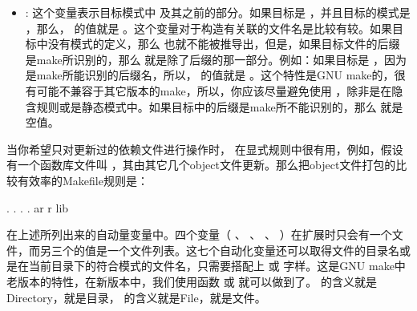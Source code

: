 \documentclass[a4paper,10pt]{sphinxmanual}
\begin{document}
\begin{itemize}
\item {} 
\sphinxcode{\sphinxupquote{\$*}} : 这个变量表示目标模式中 \sphinxcode{\sphinxupquote{\%}} 及其之前的部分。如果目标是  ，并且目标的模式是  ，那么， \sphinxcode{\sphinxupquote{\$*}} 的值就是  。这个变量对于构造有关联的文件名是比较有较。如果目标中没有模式的定义，那么 \sphinxcode{\sphinxupquote{\$*}} 也就不能被推导出，但是，如果目标文件的后缀是make所识别的，那么 \sphinxcode{\sphinxupquote{\$*}} 就是除了后缀的那一部分。例如：如果目标是  ，因为
 是make所能识别的后缀名，所以， \sphinxcode{\sphinxupquote{\$*}} 的值就是  。这个特性是GNU make的，很有可能不兼容于其它版本的make，所以，你应该尽量避免使用 \sphinxcode{\sphinxupquote{\$*}} ，除非是在隐含规则或是静态模式中。如果目标中的后缀是make所不能识别的，那么 \sphinxcode{\sphinxupquote{\$*}} 就是空值。

\end{itemize}

当你希望只对更新过的依赖文件进行操作时，  在显式规则中很有用，例如，假设有一个函数库文件叫  ，其由其它几个object文件更新。那么把object文件打包的比较有效率的Makefile规则是：

\begin{sphinxVerbatim}[commandchars=\\\{\}]
 . . . .
    ar r lib 
\end{sphinxVerbatim}

在上述所列出来的自动量变量中。四个变量（  、 \sphinxcode{\sphinxupquote{\$\textless{}}} 、 \sphinxcode{\sphinxupquote{\$\%}} 、 \sphinxcode{\sphinxupquote{\$*}} ）在扩展时只会有一个文件，而另三个的值是一个文件列表。这七个自动化变量还可以取得文件的目录名或是在当前目录下的符合模式的文件名，只需要搭配上  或  字样。这是GNU make中老版本的特性，在新版本中，我们使用函数  或  就可以做到了。  的含义就是Directory，就是目录，  的含义就是File，就是文件。
\end{document}
